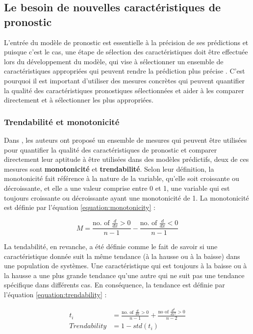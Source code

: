 \subsection{Le besoin de nouvelles caractéristiques de pronostic}%
\label{sub:the_need_for_appropriate_features}
L'entrée du modèle de pronostic est essentielle à la précision de ses prédictions \cite{coble2009} et puisque c'est le cas, une étape de sélection des caractéristiques doit être effectuée lors du développement du modèle, qui vise à sélectionner un ensemble de caractéristiques appropriées qui peuvent rendre la prédiction plus précise \cite{javed2012}. C'est pourquoi il est important d'utiliser des mesures concrètes qui peuvent quantifier la qualité des caractéristiques pronostiques sélectionnées et aider à les comparer directement et à sélectionner les plus appropriées.

\subsubsection{Trendabilité et monotonicité}%
\label{subsub:trendability_and_monotonicity}
Dans \cite{coble2009}, les auteurs ont proposé un ensemble de mesures qui peuvent être utilisées pour quantifier la qualité des caractéristiques de pronostic et comparer directement leur aptitude à être utilisées dans des modèles prédictifs, deux de ces mesures sont \textbf{monotonicité} et \textbf{trendabilité}. Selon leur définition, la monotonicité fait référence à la nature de la variable, qu'elle soit croissante ou décroissante, et elle a une valeur comprise entre 0 et 1, une variable qui est toujours croissante ou décroissante ayant une monotonicité de 1. La monotonicité est définie par l'équation \ref{equation:monotonicity} : 

\begin{equation}
	M=\frac{\text{no. of }\frac{d}{dx} > 0}{n-1} - \frac{\text{no. of }\frac{d}{dx} < 0}{n-1}
\label{equation:monotonicity}
\end{equation}

La tendabilité, en revanche, a été définie comme le fait de savoir si une caractéristique donnée suit la même tendance (à la hausse ou à la baisse) dans une population de systèmes. Une caractéristique qui est toujours à la baisse ou à la hausse a une plus grande tendance qu'une autre qui ne suit pas une tendance spécifique dans différents cas. En conséquence, la tendance est définie par l'équation \ref{equation:trendability} :  

\begin{equation}
	\begin{aligned}
		t_i&= \frac{\text{no. of }\frac{d}{dx}>0}{n-1}+\frac{\text{no of } \frac{d^2}{dx^2}>0}{n-2}\\
Trendability&=1-std(t_i)
	\end{aligned}
	\label{equation:trendability}
\end{equation}

